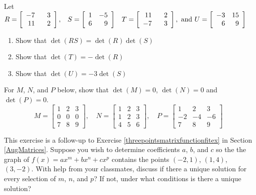 \documentclass{ximera}
\begin{document}
\begin{problem}
Let $R = \left[ \begin{array}{rr} -7 & 3 \\ 11 & \hphantom{-} 2 \end{array} \right], \;\;\; S = \left[ \begin{array}{rr} 1 & -5 \\ 6 & 9 \end{array} \right] \;\;\; T = \left[ \begin{array}{rr} 11 & \hphantom{-} 2 \\ -7 & 3  \end{array} \right], \mbox{ and } U = \left[ \begin{array}{rr} -3 & 15 \\ 6 & 9 \end{array} \right]$

\begin{enumerate}

\item Show that $\det(RS) = \det(R)\det(S)$

\item Show that $\det(T) = -\det(R)$

\item Show that $\det(U) = -3\det(S)$

\end{enumerate}
\end{problem}
  
\begin{problem}
For $M$,  $N$, and $P$ below, show that $\det(M) = 0$, $\det(N) = 0$ and $\det(P) = 0$. \[M = \left[ \begin{array}{rrr} 1 & 2 & 3 \\ 0 & 0 & 0 \\ 7 & 8 & 9 \end{array} \right], \quad N = \left[ \begin{array}{rrr} 1 & 2 & 3 \\ 1 & 2 & 3 \\ 4 & 5 & 6 \end{array} \right] , \quad  P =  \left[ \begin{array}{rrr} 1 & 2 & 3 \\ -2 & -4 & -6 \\ 7 & 8 & 9 \end{array} \right]  \]
\end{problem}

\begin{problem}
This exercise is a follow-up to Exercise \ref{threepointsmatrixfunctionfitex} in Section \ref{AugMatrices}.   Suppose you wish to determine coefficients $a$, $b$, and $c$ so the the graph of $f(x) = ax^{m} + bx^{n} + cx^{p}$ contains the points  $(-2,1)$, $(1,4)$, $(3,-2)$.  With help from your classmates, discuss if there a unique solution for every selection of $m$, $n$, and $p$?  If not, under what conditions is there a unique solution?
\end{problem}
\end{document}
